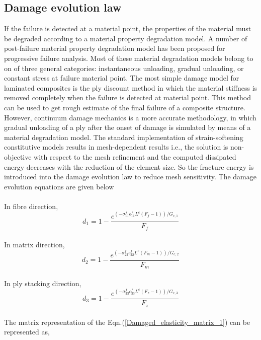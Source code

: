 \subsection{Damage evolution law}
\indent\indent\indent  If the failure is detected at a material point, the properties of the material must be degraded according to a material property degradation model. A number of post-failure material property degradation model has been proposed for progressive failure analysis. Most of these material degradation models belong to on of three general categories: instantaneous unloading, gradual unloading, or constant stress at failure material point. The most simple damage model for laminated composites is the ply discount method in which the material stiffness is removed completely when the failure is detected at material point. This method can be used to get rough estimate of the final failure of a composite structure. However, continuum damage mechanics is a more accurate methodology, in which gradual unloading of a ply after the onset of damage is simulated by means of a material degradation model. The standard implementation of strain-softening constitutive models results in mesh-dependent results i.e., the solution is non-objective with respect to the mesh refinement and the computed dissipated energy decreases with the reduction of the element size. So the fracture energy is introduced into the damage evolution law to reduce mesh sensitivity. The damage evolution equations are given below
\\
\\
In fibre direction,
\begin{equation}
d_{1} = 1 - \frac{e^{(-\sigma_{11}^{f}\epsilon_{11}^{f}L^{c}(F_{f} - 1))    /G_{c,1}}}{F_{f}}   
\end{equation}
\\
In matrix direction,
\begin{equation}
d_{2} = 1 - \frac{e^{(-\sigma_{22}^{f}\epsilon_{22}^{f}L^{c}(F_{m} - 1))    /G_{c,2}}}{F_{m}}   
\end{equation}
\\
In ply stacking direction,
\begin{equation}
d_{3} = 1 - \frac{e^{(-\sigma_{33}^{f}\epsilon_{33}^{f}L^{c}(F_{z} - 1))    /G_{c,3}}}{F_{z}}   
\end{equation}
\\



The matrix representation of the Eqn.(\ref{Damaged_elasticity_matrix_1}) can be represented as,\\

